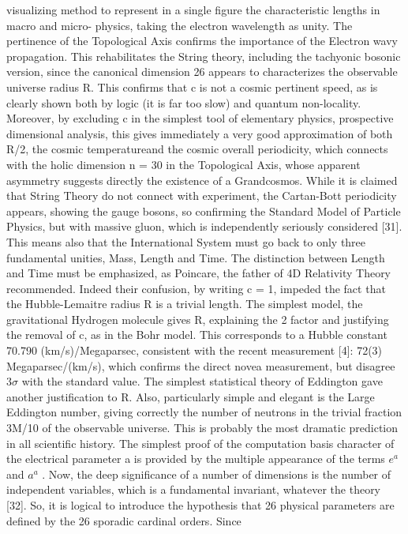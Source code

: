 \documentclass[twoside,draft]{article}
\begin{document}
{visualizing method to represent in a single figure the characteristic lengths in macro and micro-
physics, taking the electron wavelength as unity. The pertinence of the Topological Axis confirms
the importance of the Electron wavy propagation. This rehabilitates the String theory, including the
tachyonic bosonic version, since the canonical dimension 26 appears to characterizes the observable
universe radius R. This confirms that c is not a cosmic pertinent speed, as is clearly shown both by
logic (it is far too slow) and quantum non-locality.
Moreover, by excluding c in the simplest tool of elementary physics, prospective dimensional
analysis, this gives immediately a very good approximation of both R/2, the cosmic temperatureand the cosmic overall periodicity, which connects with the holic dimension n = 30 in the
Topological Axis, whose apparent asymmetry suggests directly the existence of a Grandcosmos.
While it is claimed that String Theory do not connect with experiment, the Cartan-Bott periodicity
appears, showing the gauge bosons, so confirming the Standard Model of Particle Physics, but with
massive gluon, which is independently seriously considered [31].
This means also that the International System must go back to only three fundamental unities,
Mass, Length and Time. The distinction between Length and Time must be emphasized, as
Poincare, the father of 4D Relativity Theory recommended. Indeed their confusion, by writing c =
1, impeded the fact that the Hubble-Lemaitre radius R is a trivial length.
The simplest model, the gravitational Hydrogen molecule gives R, explaining the 2 factor and
justifying the removal of c, as in the Bohr model. This corresponds to a Hubble constant 70.790
(km/s)/Megaparsec, consistent with the recent measurement [4]: 72(3) Megaparsec/(km/s), which
confirms the direct novea measurement, but disagree $3\sigma$ with the standard value.
The simplest statistical theory of Eddington gave another justification to R. Also, particularly
simple and elegant is the Large Eddington number, giving correctly the number of neutrons in the
trivial fraction 3M/10 of the observable universe. This is probably the most dramatic prediction in
all scientific history.
The simplest proof of the computation basis character of the electrical parameter a is provided
by the multiple appearance of the terms $e^{a}$ and $a^{a}$ .
Now, the deep significance of a number of dimensions is the number of independent variables,
which is a fundamental invariant, whatever the theory [32]. So, it is logical to introduce the
hypothesis that 26 physical parameters are defined by the 26 sporadic cardinal orders. Since
}
\end{document}
